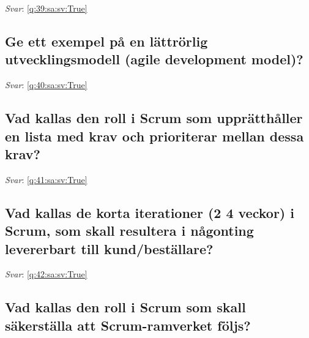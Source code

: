 \documentclass[a4paper,11pt,oneside]{article}
\begin{document}
\begin{sloppypar}
\textit{Svar}: \autoref{q:39:sa:sv:True}



\subsection{Ge ett exempel p\r{a} en l\"attr\"orlig utvecklingsmodell (agile development model)?}

\label{q:40:sa:sv:False}

\vspace{2cm}

\noindent\makebox[\textwidth]{\hrulefill}

\vspace{1cm}

\textit{Svar}: \autoref{q:40:sa:sv:True}



\subsection{Vad kallas den roll i Scrum som uppr\"atth\r{a}ller en lista med krav och prioriterar mellan dessa krav?}

\label{q:41:sa:sv:False}

\vspace{2cm}

\noindent\makebox[\textwidth]{\hrulefill}

\vspace{1cm}

\textit{Svar}: \autoref{q:41:sa:sv:True}



\subsection{Vad kallas de korta iterationer (2 {\textendash} 4 veckor) i Scrum, som skall resultera i n\r{a}gonting levererbart till kund/best\"allare?}

\label{q:42:sa:sv:False}

\vspace{2cm}

\noindent\makebox[\textwidth]{\hrulefill}

\vspace{1cm}

\textit{Svar}: \autoref{q:42:sa:sv:True}



\subsection{Vad kallas den roll i Scrum som skall s\"akerst\"alla att Scrum-ramverket f\"oljs?}


\end{sloppypar}
\end{document}
